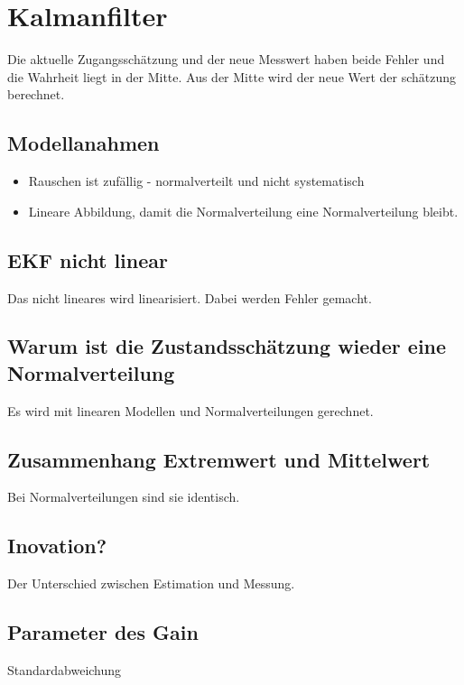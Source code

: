 



\section{Kalmanfilter}
\label{sec:faq:kap3}

Die aktuelle Zugangsschätzung und der neue Messwert haben beide Fehler und die Wahrheit liegt in der Mitte. Aus der Mitte wird der neue Wert der schätzung berechnet.


\subsection{Modellanahmen}

\begin{itemize}
	\item Rauschen ist zufällig - normalverteilt und nicht systematisch
	\item Lineare Abbildung, damit die Normalverteilung eine Normalverteilung bleibt.
\end{itemize}

\subsection{EKF nicht linear}
 Das nicht lineares wird linearisiert. Dabei werden Fehler gemacht.

\subsection{Warum ist die Zustandsschätzung wieder eine Normalverteilung}
Es wird mit linearen Modellen und Normalverteilungen gerechnet.

\subsection{Zusammenhang Extremwert und Mittelwert}
Bei Normalverteilungen sind sie identisch.

\subsection{Inovation?}
Der Unterschied zwischen Estimation und Messung.

\subsection{Parameter des Gain}
Standardabweichung

